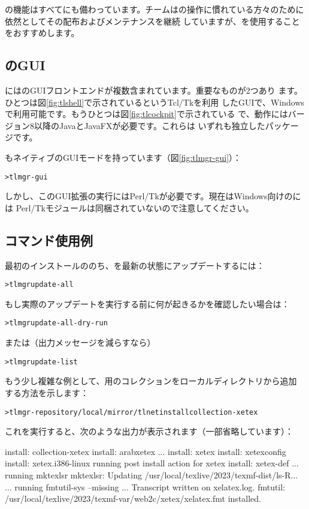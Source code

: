 \documentclass[uplatex,dvipdfmx]{jsarticle}
\begin{document}
の機能はすべてにも備わっています。\TL チームはの操作に慣れている方々のために依然としてその配布およびメンテナンスを継続
していますが、を使用することをおすすめします。

\subsection{のGUI}

\TL にはのGUIフロントエンドが複数含まれています。重要なものが2つあり
ます。ひとつは図\ref{fig:tlshell}で示されているというTcl/Tkを利用
したGUIで、Windowsで利用可能です。もうひとつは図\ref{fig:tlcockpit}で示されている
で、動作にはバージョン8以降のJavaとJavaFXが必要です。これらは
いずれも独立したパッケージです。

もネイティブのGUIモードを持っています（図\ref{fig:tlmgr-gui}）：
%
\begin{alltt}
> tlmgr -gui
\end{alltt}
%
しかし、このGUI拡張の実行にはPerl/Tkが必要です。現在はWindows向けの\TL には
Perl/Tkモジュールは同梱されていないので注意してください。

\subsection{コマンド使用例}

最初のインストールののち、\TL を最新の状態にアップデートするには：
%
\begin{alltt}
> tlmgr update -all
\end{alltt}
%
もし実際のアップデートを実行する前に何が起きるかを確認したい場合は：
%
\begin{alltt}
> tlmgr update -all -dry-run
\end{alltt}
%
または（出力メッセージを減らすなら）
%
\begin{alltt}
> tlmgr update -list
\end{alltt}

もう少し複雑な例として、\XeTeX 用のコレクションをローカルディレクトリから追加
する方法を示します：
%
\begin{alltt}
> tlmgr -repository /local/mirror/tlnet install collection-xetex
\end{alltt}
%
これを実行すると、次のような出力が表示されます（一部省略しています）：
%
\begin{fverbatim}
install: collection-xetex
install: arabxetex
...
install: xetex
install: xetexconfig
install: xetex.i386-linux
running post install action for xetex
install: xetex-def
...
running mktexlsr
mktexlsr: Updating /usr/local/texlive/2023/texmf-dist/ls-R...
...
running fmtutil-sys --missing
...
Transcript written on xelatex.log.
fmtutil: /usr/local/texlive/2023/texmf-var/web2c/xetex/xelatex.fmt installed.
\end{fverbatim}
\end{document}
